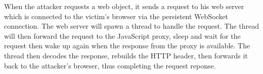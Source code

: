 When the attacker requests a web object, it sends a request to his web server which is connected to the victim's browser via the persistent WebSocket connection. The web server will spawn a thread to handle the request. The thread will then forward the request to the JavaScript proxy, sleep and wait for the request then wake up again when the response from the proxy is available. The thread then decodes the response, rebuilds the HTTP header, then forwards it back to the attacker's browser, thus completing the request reponse.
